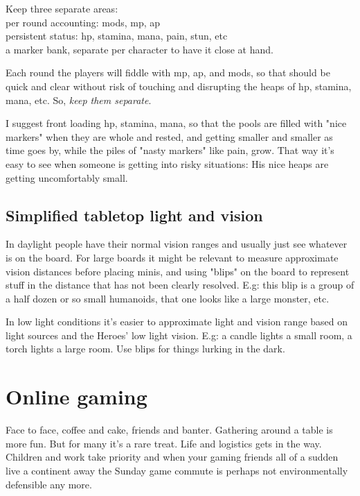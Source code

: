 Keep three separate areas:\\
per round accounting: mods, mp, ap\\
persistent status: hp, stamina, mana, pain, stun, etc\\
a marker bank, separate per character to have it close at hand.

Each round the players will fiddle with mp, ap, and mods, so that should be quick and clear without risk of touching and disrupting the heaps of hp, stamina, mana, etc. So, \emph{keep them separate}.

I suggest front loading hp, stamina, mana, so that the pools are filled with "nice markers" when they are whole and rested, and getting smaller and smaller as time goes by, while the piles of "nasty markers" like pain, grow. That way it's easy to see when someone is getting into risky situations: His nice heaps are getting uncomfortably small.


\subsection*{Simplified tabletop light and vision}
In daylight people have their normal vision ranges and usually just see whatever is on the board. For large boards it might be relevant to measure approximate vision distances before placing minis, and using "blips" on the board to represent stuff in the distance that has not been clearly resolved. E.g: this blip is a group of a half dozen or so small humanoids, that one looks like a large monster, etc.

In low light conditions it's easier to approximate light and vision range based on light sources and the Heroes' low light vision. E.g: a candle lights a small room, a torch lights a large room. Use blips for things lurking in the dark.









\section*{Online gaming}
Face to face, coffee and cake, friends and banter. Gathering around a table is more fun. But for many it's a rare treat. Life and logistics gets in the way. Children and work take priority and when your gaming friends all of a sudden live a continent away the Sunday game commute is perhaps not environmentally defensible any more.

